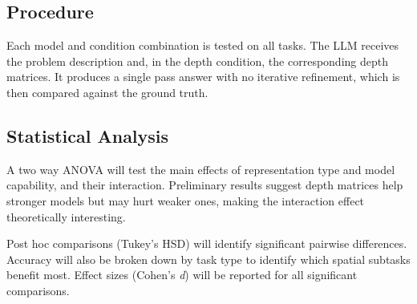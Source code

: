 \documentclass[stu,12pt,a4paper,floatsintext]{apa7}
\begin{document}
\subsection*{Procedure}

Each model and condition combination is tested on all tasks. The LLM receives the problem description and, in the depth condition, the corresponding depth matrices. It produces a single pass answer with no iterative refinement, which is then compared against the ground truth.

\subsection*{Statistical Analysis}

A two way ANOVA will test the main effects of representation type and model capability, and their interaction. Preliminary results suggest depth matrices help stronger models but may hurt weaker ones, making the interaction effect theoretically interesting.

Post hoc comparisons (Tukey's HSD) will identify significant pairwise differences. Accuracy will also be broken down by task type to identify which spatial subtasks benefit most. Effect sizes (Cohen's \emph{d}) will be reported for all significant comparisons.
\end{document}
